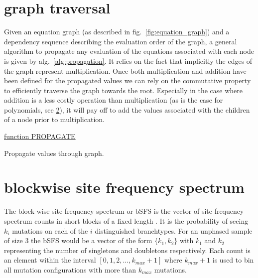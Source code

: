 \documentclass[10pt, a4]{article}
\begin{document}
\section{graph traversal} \label{graph_traversal}

Given an equation graph (as described in fig.\ \ref{fig:equation_graph}) and a dependency sequence describing the evaluation order of the graph, a general algorithm to propagate any evaluation of the equations associated with each node is given by alg.\ \ref{alg:propagation}. It relies on the fact that implicitly the edges of the graph represent multiplication. Once both multiplication and addition have been defined for the propagated values we can rely on the commutative property to efficiently traverse the graph towards the root. Especially in the case where addition is a less costly operation than multiplication (as is the case for polynomials, see \ref{bsfs}), it will pay off to add the values associated with the children of a node prior to multiplication.

\begin{algorithm}\label{alg:propagation}
	
    \underline{function PROPAGATE}\;
    

    \caption{Propagate values through graph.}
\end{algorithm}

\section{blockwise site frequency spectrum} \label{bsfs}

The block-wise site frequency spectrum or bSFS is the vector of site frequency spectrum counts in short blocks of a fixed length \citep{Bunnefeld2015}. It is the probability of seeing $k_i$ mutations on each of the $i$ distinguished branchtypes. For an unphased sample of size 3 the bSFS would be a vector of the form $\{k_1, k_2\}$ with $k_1$ and $k_2$ representing the number of singletons and doubletons respectively. Each count is an element within the interval $[0, 1, 2, ... , k_{max} + 1]$ where $k_{max} + 1$ is used to bin all mutation configurations with more than $k_{max}$ mutations. 
\end{document}

